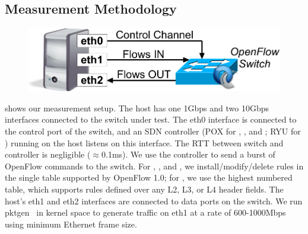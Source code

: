 \subsection{Measurement Methodology}

\begin{figure}[!tb]
\centering
\includegraphics[width=0.7\columnwidth]{figs/experiment_setup.pdf}
\label{experiment_setup} 
\end{figure}

 shows our measurement setup.
The host has one 1Gbps and two 10Gbps interfaces connected to the switch under test. 
The eth0 interface is connected to the control port of the switch, and an SDN
controller (POX for \Intel, \BroadcomOne, and \IBM; RYU for \BroadcomThree) running
on the host listens on this interface. 
The RTT between switch and controller is
negligible ($\approx$0.1ms). We use the controller to send a burst of OpenFlow 
\flowmod commands to the switch. For \Intel, \BroadcomOne, and \IBM, we
install/modify/delete rules in the single table supported by OpenFlow 1.0;
for \BroadcomThree, we use the highest numbered table, which supports
rules defined over any L2, L3, or L4 header fields.
The host's eth1 and eth2 interfaces are connected to data ports on the
switch. We run pktgen~\cite{pktgen} in kernel space to generate traffic on
eth1 at a rate of 600-1000Mbps using minimum Ethernet frame size.

